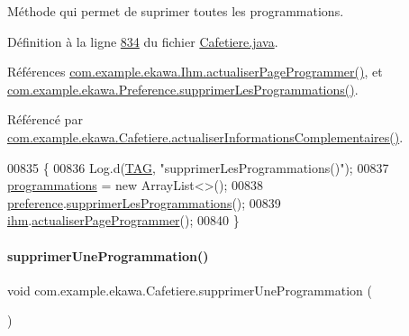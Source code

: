 Méthode qui permet de suprimer toutes les programmations. 



Définition à la ligne \hyperlink{_cafetiere_8java_source_l00834}{834} du fichier \hyperlink{_cafetiere_8java_source}{Cafetiere.\+java}.



Références \hyperlink{_ihm_8java_source_l00938}{com.\+example.\+ekawa.\+Ihm.\+actualiser\+Page\+Programmer()}, et \hyperlink{_preference_8java_source_l00142}{com.\+example.\+ekawa.\+Preference.\+supprimer\+Les\+Programmations()}.



Référencé par \hyperlink{_cafetiere_8java_source_l00574}{com.\+example.\+ekawa.\+Cafetiere.\+actualiser\+Informations\+Complementaires()}.


\begin{DoxyCode}
00835     \{
00836         Log.d(\hyperlink{classcom_1_1example_1_1ekawa_1_1_cafetiere_aa0c1fd99a2508b06c462aea17034aa91}{TAG}, \textcolor{stringliteral}{"supprimerLesProgrammations()"});
00837         \hyperlink{classcom_1_1example_1_1ekawa_1_1_cafetiere_a987c8e1bcea506b65f4b05f955b3f699}{programmations} = \textcolor{keyword}{new} ArrayList<>();
00838         \hyperlink{classcom_1_1example_1_1ekawa_1_1_cafetiere_aee3f9b78df63bc8dd73bf564954d51ca}{preference}.\hyperlink{classcom_1_1example_1_1ekawa_1_1_preference_aec0e98bb3cfb4d104c5c86a4259c56b5}{supprimerLesProgrammations}();
00839         \hyperlink{classcom_1_1example_1_1ekawa_1_1_cafetiere_a7db4a63088834eda5f6a3e951611bf82}{ihm}.\hyperlink{classcom_1_1example_1_1ekawa_1_1_ihm_adbeeac61b5a53c52d21da490659de983}{actualiserPageProgrammer}();
00840     \}
\end{DoxyCode}
\mbox{\label{classcom_1_1example_1_1ekawa_1_1_cafetiere_a40880363bf27354c1a7cb5df139fae53}} 
\paragraph{\texorpdfstring{supprimer\+Une\+Programmation()}{supprimerUneProgrammation()}}
{\footnotesize\ttfamily void com.\+example.\+ekawa.\+Cafetiere.\+supprimer\+Une\+Programmation (\begin{DoxyParamCaption}{ }\end{DoxyParamCaption})\hspace{0.3cm}{\ttfamily [private]}}



